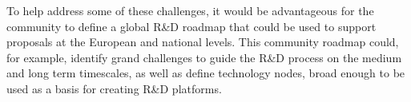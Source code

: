 To help address some of these challenges, it would be advantageous 
for the community to define a global R\&D roadmap that could be used to support proposals at the European and national levels.  This community roadmap could, for example, identify grand challenges to guide the R\&D process on the medium and long term timescales, as well as define technology nodes, broad enough to be used as a basis for creating R\&D platforms. 




